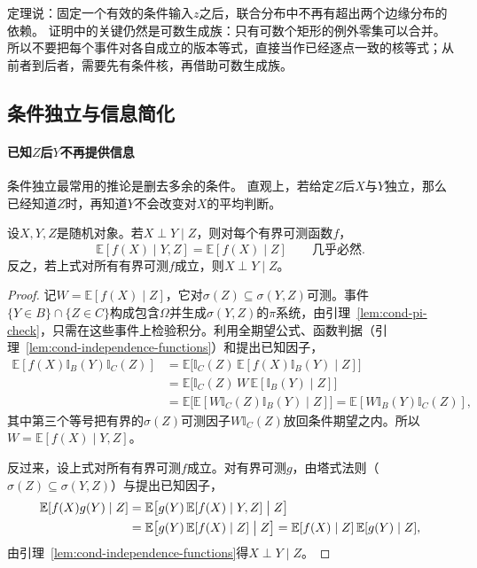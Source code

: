 定理说：固定一个有效的条件输入$z$之后，联合分布中不再有超出两个边缘分布的依赖。
证明中的关键仍然是可数生成族：只有可数个矩形的例外零集可以合并。
所以不要把每个事件对各自成立的版本等式，直接当作已经逐点一致的核等式；从前者到后者，需要先有条件核，再借助可数生成族。

\subsection{条件独立与信息简化}

\paragraph{已知$Z$后$Y$不再提供信息}
条件独立最常用的推论是删去多余的条件。
直观上，若给定$Z$后$X$与$Y$独立，那么已经知道$Z$时，再知道$Y$不会改变对$X$的平均判断。

\begin{theorem}[条件独立下的信息简化]
\label{thm:cond-independence-reduction}
设$X,Y,Z$是随机对象。若$X\perp Y\mid Z$，则对每个有界可测函数$f$，
\[
  \mathbb E[f(X)\mid Y,Z]=\mathbb E[f(X)\mid Z]\qquad\text{几乎必然}.
\]
反之，若上式对所有有界可测$f$成立，则$X\perp Y\mid Z$。
\end{theorem}

\begin{proof}
记$W=\mathbb E[f(X)\mid Z]$，它对$\sigma(Z)\subseteq\sigma(Y,Z)$可测。事件$\{Y\in B\}\cap\{Z\in C\}$构成包含$\Omega$并生成$\sigma(Y,Z)$的$\pi$系统，由引理~\ref{lem:cond-pi-check}，只需在这些事件上检验积分。利用全期望公式、函数判据（引理~\ref{lem:cond-independence-functions}）和提出已知因子，
\[
  \begin{aligned}
  \mathbb E[f(X)\mathbb I_B(Y)\mathbb I_C(Z)]
  &=\mathbb E\bigl[\mathbb I_C(Z)\,\mathbb E[f(X)\mathbb I_B(Y)\mid Z]\bigr]\\
  &=\mathbb E\bigl[\mathbb I_C(Z)\,W\,\mathbb E[\mathbb I_B(Y)\mid Z]\bigr]\\
  &=\mathbb E\bigl[\mathbb E[W\mathbb I_C(Z)\mathbb I_B(Y)\mid Z]\bigr]
  =\mathbb E[W\mathbb I_B(Y)\mathbb I_C(Z)],
  \end{aligned}
\]
其中第三个等号把有界的$\sigma(Z)$可测因子$W\mathbb I_C(Z)$放回条件期望之内。所以$W=\mathbb E[f(X)\mid Y,Z]$。

反过来，设上式对所有有界可测$f$成立。对有界可测$g$，由塔式法则（$\sigma(Z)\subseteq\sigma(Y,Z)$）与提出已知因子，
\[
  \begin{aligned}
  \mathbb E[f(X)g(Y)\mid Z]&=\mathbb E\bigl[g(Y)\,\mathbb E[f(X)\mid Y,Z]\bigm|Z\bigr]\\
  &=\mathbb E\bigl[g(Y)\,\mathbb E[f(X)\mid Z]\bigm|Z\bigr]=\mathbb E[f(X)\mid Z]\,\mathbb E[g(Y)\mid Z],
  \end{aligned}
\]
由引理~\ref{lem:cond-independence-functions}得$X\perp Y\mid Z$。
\end{proof}

